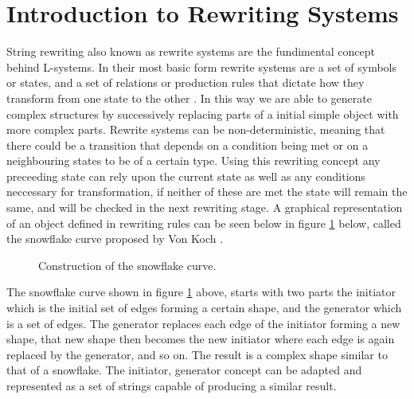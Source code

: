 \section{Introduction to Rewriting Systems}

\begin{flushleft}

String rewriting also known as rewrite systems are the fundimental concept behind L-systems. In their most basic form rewrite systems are a set of symbols or states, and a set of relations or production rules that dictate how they transform from one state to the other \cite{prusinkiewicz2012algorithmic}. In this way we are able to generate complex structures by successively replacing parts of a initial simple object with more complex parts. Rewrite systems can be non-deterministic, meaning that there could be a transition that depends on a condition being met or on a neighbouring states to be of a certain type. Using this rewriting concept any preceeding state can rely upon the current state as well as any conditions neccessary for transformation, if neither of these are met the state will remain the same, and will be checked in the next rewriting stage. A graphical representation of an object defined in rewriting rules can be seen below in figure \ref{snowflake curve} below, called the snowflake curve proposed by Von Koch \cite{koch1906methode}.

\begin{figure}[htbp]
	{\centering
		\setlength{\fboxrule}{1pt}
		\vspace{7px}
		\caption{Construction of the snowflake curve\cite{prusinkiewicz2013lindenmayer}.} \label{snowflake curve}
	}
\end{figure}
\FloatBarrier

The snowflake curve shown in figure \ref{snowflake curve} above, starts with two parts the initiator which is the initial set of edges forming a certain shape, and the generator which is a set of edges. The generator replaces each edge of the initiator forming a new shape, that new shape then becomes the new initiator where each edge is again replaced by the generator, and so on. The result is a complex shape similar to that of a snowflake. The initiator, generator concept can be adapted and represented as a set of strings capable of producing a similar result.

\end{flushleft}

